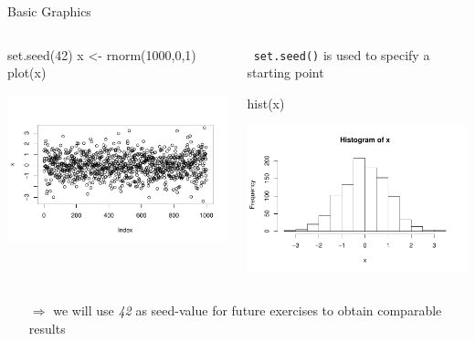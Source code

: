 \documentclass[11pt,german,hideothersubsections]{beamer}
\newcommand{\R}[1]{{\tt \color{blue}  #1}}
\begin{document}
\begin{frame}[fragile]{Basic Graphics}

\begin{columns}
\begin{column}{.5\textwidth}
\begin{Schunk}
\begin{Sinput}
 set.seed(42)
 x <- rnorm(1000,0,1)
 plot(x)
\end{Sinput}
\end{Schunk}
\includegraphics{Day1-010}
\end{column}
\vspace{.25cm}
\begin{column}{.5\textwidth}

\R{set.seed()} is used to specify a starting point

\begin{Schunk}
\begin{Sinput}
 hist(x)
\end{Sinput}
\end{Schunk}
\includegraphics{Day1-011}
\end{column}
\end{columns}
\begin{itemize}
\item[$\Rightarrow$] we will use \emph{42} as seed-value for future exercises to obtain comparable results
\end{itemize}
\end{frame}
\end{document}
